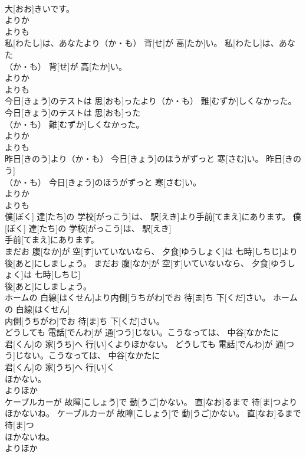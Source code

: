 \documentclass[8pt]{extreport}
\begin{document}
\begin{CJK}{UTF8}{min}
\\	大[おお]きいです。	
\\	よりか 
\\	よりも
\\	私[わたし]は、あなたより（か・も） 背[せ]が 高[たか]い。	私[わたし]は、あなた
\\	（か・も） 背[せ]が 高[たか]い。	
\\	よりか 
\\	よりも
\\	今日[きょう]のテストは 思[おも]ったより（か・も） 難[むずか]しくなかった。	今日[きょう]のテストは 思[おも]った
\\	（か・も） 難[むずか]しくなかった。	
\\	よりか 
\\	よりも
\\	昨日[きのう]より（か・も） 今日[きょう]のほうがずっと 寒[さむ]い。	昨日[きのう]
\\	（か・も） 今日[きょう]のほうがずっと 寒[さむ]い。	
\\	よりか 
\\	よりも
\\	僕[ぼく] 達[たち]の 学校[がっこう]は、 駅[えき]より手前[てまえ]にあります。	僕[ぼく] 達[たち]の 学校[がっこう]は、 駅[えき]
\\	手前[てまえ]にあります。	
\\	まだお 腹[なか]が 空[す]いていないなら、 夕食[ゆうしょく]は 七時[しちじ]より後[あと]にしましょう。	まだお 腹[なか]が 空[す]いていないなら、 夕食[ゆうしょく]は 七時[しちじ]
\\	後[あと]にしましょう。	
\\	ホームの 白線[はくせん]より内側[うちがわ]でお 待[ま]ち 下[くだ]さい。	ホームの 白線[はくせん]
\\	内側[うちがわ]でお 待[ま]ち 下[くだ]さい。	
\\	どうしても 電話[でんわ]が 通[つう]じない。こうなっては、 中谷[なかたに 
\\	君[くん]の 家[うち]へ 行[い]くよりほかない。	どうしても 電話[でんわ]が 通[つう]じない。こうなっては、 中谷[なかたに 
\\	君[くん]の 家[うち]へ 行[い]く
\\	ほかない。	
\\	よりほか 
\\	ケーブルカーが 故障[こしょう]で 動[うご]かない。 直[なお]るまで 待[ま]つよりほかないね。	ケーブルカーが 故障[こしょう]で 動[うご]かない。 直[なお]るまで 待[ま]つ
\\	ほかないね。	
\\	よりほか 

\end{CJK}
\end{document}
